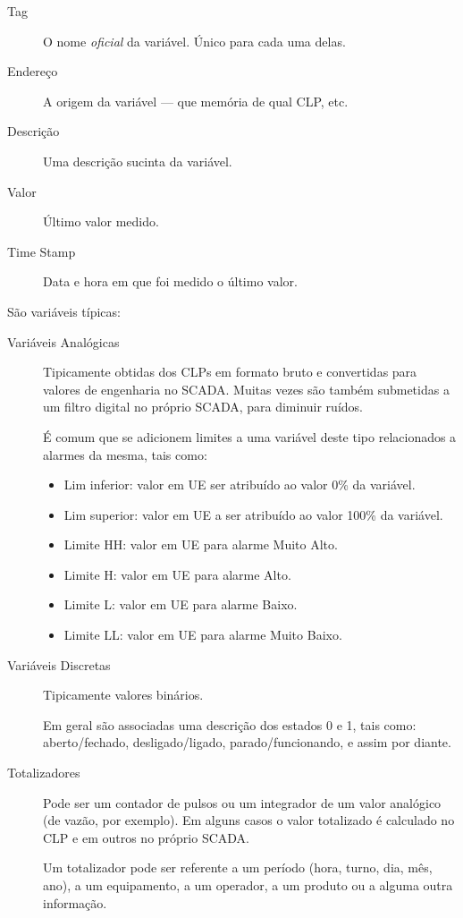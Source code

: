 \begin{description}
	\item[Tag] O nome \emph{oficial} da variável. Único para cada uma delas.
	\item[Endereço] A origem da variável --- que memória de qual CLP, etc.
	\item[Descrição] Uma descrição sucinta da variável.
	\item[Valor] Último valor medido.
	\item[Time Stamp] Data e hora em que foi medido o último valor.
\end{description}

São variáveis típicas:
\begin{description}
	\item[Variáveis Analógicas] Tipicamente obtidas dos CLPs em formato bruto e convertidas para valores de engenharia no SCADA. Muitas vezes são também submetidas a um filtro digital no próprio SCADA, para diminuir ruídos.

	É comum que se adicionem limites a uma variável deste tipo relacionados a alarmes da mesma, tais como:
	\begin{itemize}
		\item Lim inferior: valor em UE ser atribuído ao valor 0\% da variável.
		\item Lim superior: valor em UE a ser atribuído ao valor 100\% da variável.
		\item Limite HH: valor em UE para alarme Muito Alto.
		\item Limite H: valor em UE para alarme Alto.
		\item Limite L: valor em UE para alarme Baixo.
		\item Limite LL: valor em UE para alarme Muito Baixo.
	\end{itemize}

	\item[Variáveis Discretas] Tipicamente valores binários.

	Em geral são associadas uma descrição dos estados 0 e 1, tais como: aberto/fechado, desligado/ligado, parado/funcionando, e assim por diante.
	\item[Totalizadores] Pode ser um contador de pulsos ou um integrador de um valor analógico (de vazão, por exemplo). Em alguns casos o valor totalizado é calculado no CLP e em outros no próprio SCADA.

	Um totalizador pode ser referente a um período (hora, turno, dia, mês, ano), a um equipamento, a um operador, a um produto ou a alguma outra informação.


\end{description}

